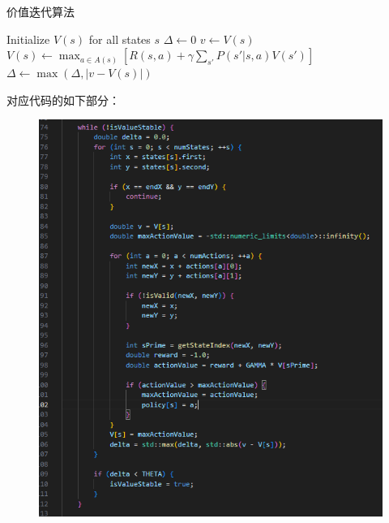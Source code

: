 \documentclass{article}
\begin{document}
\begin{algorithm}[H]
    \caption{价值迭代算法}
    \begin{algorithmic}[1]
        \State Initialize $V(s)$ for all states $s$
        \Repeat
            \State $\Delta \gets 0$
                \State $v \gets V(s)$
                \State $V(s) \gets \max_{a \in A(s)} \left[ R(s, a) + \gamma \sum_{s'} P(s' | s, a) V(s') \right]$
                \State $\Delta \gets \max(\Delta, |v - V(s)|)$
            \EndFor
        \Until{$\Delta < \theta$}
    \end{algorithmic}
\end{algorithm}
对应代码的如下部分：
\begin{figure}[H]
    \centering
    \includegraphics[width=0.8\linewidth]{./image/image1.png}
    \caption{}
\end{figure}
\end{document}
